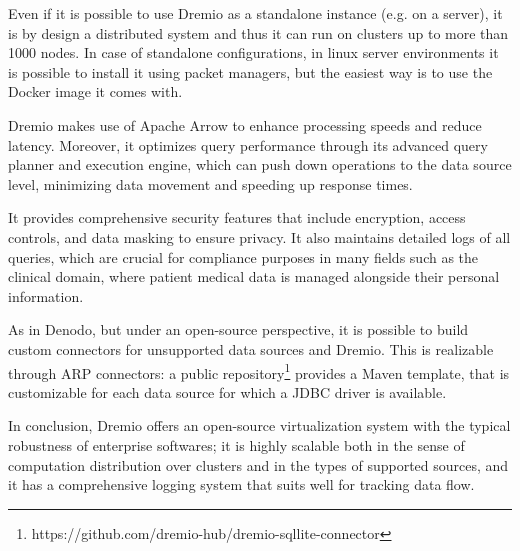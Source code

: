 Even if it is possible to use Dremio as a standalone instance (e.g. on a server), it is by design a distributed system and thus it can run on clusters up to more than 1000 nodes. In case of standalone configurations, in linux server environments it is possible to install it using packet managers, but the easiest way is to use the Docker image it comes with.

Dremio makes use of Apache Arrow to enhance processing speeds and reduce latency. Moreover, it optimizes query performance through its advanced query planner and execution engine, which can push down operations to the data source level, minimizing data movement and speeding up response times.

It provides comprehensive security features that include encryption, access controls, and data masking to ensure privacy. It also maintains detailed logs of all queries, which are crucial for compliance purposes in many fields such as the clinical domain, where patient medical data is managed alongside their personal information.

As in Denodo, but under an open-source perspective, it is possible to build custom connectors for unsupported data sources and Dremio. This is realizable through \ac{ARP} connectors: a public repository\footnote{https://github.com/dremio-hub/dremio-sqllite-connector} provides a Maven template, that is customizable for each data source for which a \ac{JDBC} driver is available.

In conclusion, Dremio offers an open-source virtualization system with the typical robustness of enterprise softwares; it is highly scalable both in the sense of computation distribution over clusters and in the types of supported sources, and it has a comprehensive logging system that suits well for tracking data flow.

